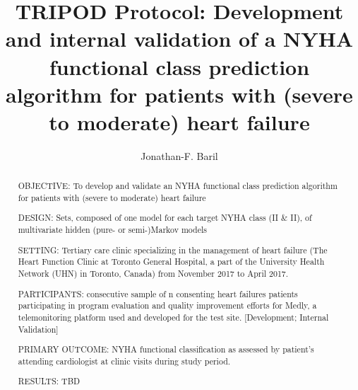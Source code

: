 \documentclass[]{article}
\title{TRIPOD Protocol:
	\linebreak
	Development and internal validation of a NYHA functional class prediction algorithm for patients with (severe to moderate) heart failure}  %
\author{Jonathan-F. Baril}
\begin{document}
\maketitle

\begin{abstract} %
\noindent OBJECTIVE: To develop and validate an NYHA functional class prediction algorithm for patients with (severe to moderate) heart failure

\noindent DESIGN: Sets, composed of one model for each target NYHA class (II \& II), of multivariate hidden (pure- or semi-)Markov models

\noindent SETTING: Tertiary care clinic specializing in the management of heart failure (The Heart Function Clinic at Toronto General Hospital, a part of the University Health Network (UHN) in Toronto, Canada) from November 2017 to April 2017.

\noindent PARTICIPANTS: consecutive sample of {n} consenting heart failures patients participating in program evaluation and quality improvement efforts for Medly, a telemonitoring platform used and developed for the test site.  [Development; Internal Validation]

\noindent PRIMARY OUTCOME: NYHA functional classification as assessed by patient's attending cardiologist at clinic visits during study period.

\noindent RESULTS: TBD %


\end{abstract}
\end{document}
